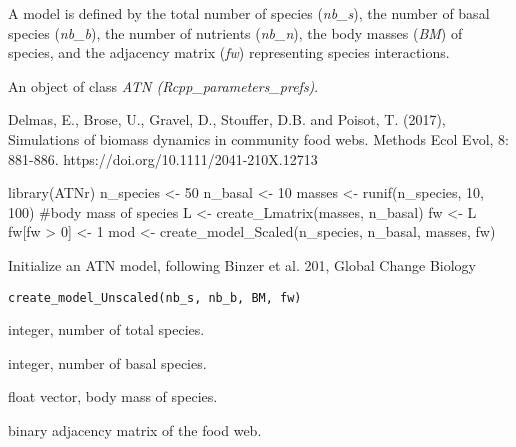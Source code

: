 \documentclass[letterpaper]{book}
\begin{document}
%
\begin{Details}\relax
A model is defined by the total number of species
(\emph{nb\_s}), the number of basal species (\emph{nb\_b}),
the number of nutrients (\emph{nb\_n}), the body masses
(\emph{BM}) of species, and the adjacency matrix (\emph{fw})
representing species interactions.
\end{Details}
%
\begin{Value}
An object of class \emph{ATN (Rcpp\_parameters\_prefs)}.
\end{Value}
%
\begin{References}\relax


Delmas, E., Brose, U., Gravel, D., Stouffer, D.B. and Poisot, T.
(2017), Simulations of biomass dynamics in community food webs. Methods
Ecol Evol, 8: 881-886. https://doi.org/10.1111/2041-210X.12713
\end{References}
%
\begin{Examples}
\begin{ExampleCode}
library(ATNr)
n_species <- 50
n_basal <- 10
masses <- runif(n_species, 10, 100) #body mass of species
L <- create_Lmatrix(masses, n_basal)
fw <- L
fw[fw > 0] <- 1
mod <- create_model_Scaled(n_species, n_basal, masses, fw)
\end{ExampleCode}
\end{Examples}
%
\begin{Description}\relax
Initialize an ATN model, following Binzer et al. 201, Global Change Biology
\end{Description}
%
\begin{Usage}
\begin{verbatim}
create_model_Unscaled(nb_s, nb_b, BM, fw)
\end{verbatim}
\end{Usage}
%
\begin{Arguments}
\begin{ldescription}
\item[\code{nb\_s}] integer, number of total species.

\item[\code{nb\_b}] integer, number of basal species.

\item[\code{BM}] float vector, body mass of species.

\item[\code{fw}] binary adjacency matrix of the food web.
\end{ldescription}
\end{Arguments}
\end{document}

